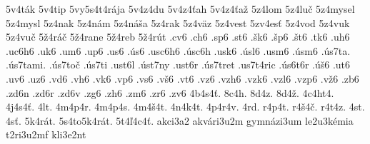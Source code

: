 {5v4t\'ak
5v4tip
5vy5s4t4r\'aja
5v4z4du
5v4z4\v tah
5v4z4\v ta\v z
5z4lom
5z4lu\v c
5z4mysel
5z4mysl
5z4nak
5z4n\'am
5z4n\'a\v sa
5z4rak
5z4v\"az
5z4vest
5zv4es\v t
5z4vod
5z4vuk
5z4vu\v c
5\v z4r\'a\v c
5\v z4rane
5\v z4reb
5\v z4r\'ut
.cv6
.ch6
.sp6
.st6
.\v sk6
.\v sp6
.\v st6
.tk6
.uh6
.uc6h6
.uk6
.um6
.up6
.us6
.\'us6
.usc6h6
.\'usc6h
.usk6
.\'usl6
.usm6
.\'usm6
.\'us7ta.
.\'us7tami.
.\'us7to\v c
.\'us7ti
.ust6l
.\'ust7ny
.ust6r
.\'us7tret
.us7t4ric
.\'us6t6r
.\'u\v s6
.ut6
.uv6
.uz6
.vd6
.vh6
.vk6
.vp6
.vs6
.v\v s6
.vt6
.vz6
.vzh6
.vzk6
.vzl6
.vzp6
.v\v z6
.zb6
.zd6n
.zd6r
.zd6v
.zg6
.zh6
.zm6
.zr6
.zv6
4b4s4\v t.
8c4h.
8d4z.
8d4\v z.
4c4ht4.
4j4s4\v t.
4lt.
4m4p4r.
4m4p4s.
4m4\v s4t.
4n4k4t.
4p4r4v.
4rd.
r4p4t.
r4\v s4\v c.
r4t4z.
4st.
4s\v t.
5k4r\'at.
5s4to5k4r\'at.
5t4\v l4c4\v t.
akci3a2
akv\'ari3u2m
gymn\'azi3um
le2u3k\'emia
t2ri3u2mf
kli3e2nt
}
\endinput
